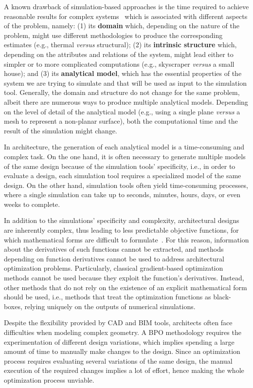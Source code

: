 	A known drawback of simulation-based approaches is the time required to achieve reasonable results for complex systems~\cite{Law1991} which is associated with different aspects of the problem, namely: (1) its \textbf{domain} which, depending on the nature of the problem, might use different methodologies to produce the corresponding estimates (e.g., thermal \textit{versus} structural); (2) its \textbf{intrinsic structure} which, depending on the attributes and relations of the system, might lead either to simpler or to more complicated computations (e.g., skyscraper \textit{versus} a small house); and (3) its \textbf{analytical model}, which has the essential properties of the system we are trying to simulate and that will be used as input to the simulation tool. Generally, the domain and structure do not change for the same problem, albeit there are numerous ways to produce multiple analytical models. Depending on the level of detail of the analytical model (e.g., using a single plane \textit{versus} a mesh to represent a non-planar surface), both the computational time and the result of the simulation might change. 

	In architecture, the generation of each analytical model is a time-consuming and complex task. On the one hand, it is often necessary to generate multiple models of the same design because of the simulation tools' specificity, i.e., in order to evaluate a design, each simulation tool requires a specialized model of the same design. On the other hand, simulation tools often yield time-consuming processes, where a single simulation can take up to seconds, minutes, hours, days, or even weeks to complete. 
	
	In addition to the simulations' specificity and complexity, architectural designs are inherently complex, thus leading to less predictable objective functions, for which mathematical forms are difficult to formulate~\cite{Machairas2014}. For this reason, information about the derivatives of such functions cannot be extracted, and methods depending on function derivatives cannot be used to address architectural optimization problems. Particularly, classical gradient-based optimization methods cannot be used because they exploit the function's derivatives. Instead, other methods that do not rely on the existence of an explicit mathematical form should be used, i.e., methods that treat the optimization functions as black-boxes, relying uniquely on the outputs of numerical simulations.
	
	Despite the flexibility provided by \ac{CAD} and \ac{BIM} tools, architects often face difficulties when modeling complex geometry. A \ac{BPO} methodology requires the experimentation of different design variations, which implies spending a large amount of time to manually make changes to the design. Since an optimization process requires evaluating several variations of the same design, the manual execution of the required changes implies a lot of effort, hence making the whole optimization process unviable.
	
